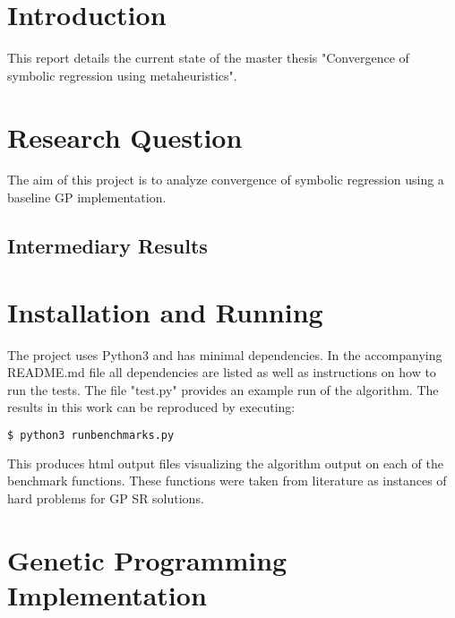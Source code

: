 \documentclass[10pt]{extarticle}
\begin{document}
\maketitle

\section{Introduction}
This report details the current state of the master thesis "Convergence of symbolic regression using metaheuristics".
\section{Research Question}
The aim of this project is to analyze convergence of symbolic regression using a baseline GP implementation. 

\subsection{Intermediary Results}

\section{Installation and Running}
The project uses Python3 and has minimal dependencies. In the accompanying README.md file all dependencies are listed as well as instructions on how to run the tests. The file "test.py" provides an example run of the algorithm. The results in this work can be reproduced by executing:
\begin{lstlisting}[language=Python]
  $ python3 runbenchmarks.py
\end{lstlisting}
This produces html output files visualizing the algorithm output on each of the benchmark functions. These functions were taken from literature as instances of hard problems for GP SR solutions.
\section{Genetic Programming Implementation}
\end{document}
